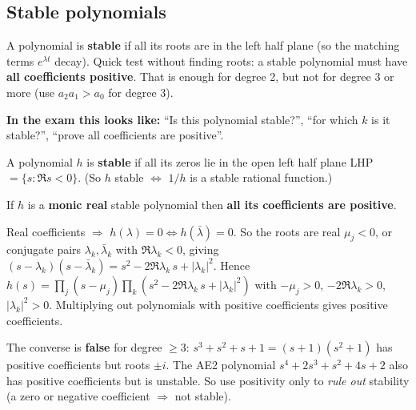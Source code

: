 \subsection{Stable polynomials \texorpdfstring{}{}}\label{sec:stabpoly}\label{ss:5-1}
\begin{plainbox}
A polynomial is \textbf{stable} if all its roots are in the left half plane (so the matching terms $e^{\lambda t}$ decay).
Quick test without finding roots: a stable polynomial must have \textbf{all coefficients positive}. That is enough for degree 2,
but not for degree 3 or more (use $a_2a_1>a_0$ for degree 3).
\par\smallskip\textbf{In the exam this looks like:} ``Is this polynomial stable?'', ``for which $k$ is it stable?'', ``prove all coefficients are positive''.
\end{plainbox}
\begin{defbox}
A polynomial $h$ is \textbf{stable} if all its zeros lie in the open left half plane LHP $=\{s:\Re s<0\}$.
(So $h$ stable $\iff$ $1/h$ is a stable rational function.)
\end{defbox}
\begin{thmbox}[title={Proposition 0.43 (necessary condition)}]
If $h$ is a \textbf{monic real} stable polynomial then \textbf{all its coefficients are positive}.
\end{thmbox}
\begin{proofbox}[title={Proof of Proposition 0.43}]
Real coefficients $\Rightarrow$ $h(\lambda)=0\iff h(\bar\lambda)=0$. So the roots are real $\mu_j<0$, or conjugate pairs $\lambda_k,\bar\lambda_k$ with $\Re\lambda_k<0$, giving
$(s-\lambda_k)(s-\bar\lambda_k)=s^2-2\Re\lambda_k\,s+|\lambda_k|^2$. Hence
$h(s)=\prod_j(s-\mu_j)\prod_k(s^2-2\Re\lambda_k\,s+|\lambda_k|^2)$ with $-\mu_j>0$, $-2\Re\lambda_k>0$, $|\lambda_k|^2>0$.
Multiplying out polynomials with positive coefficients gives positive coefficients.
\end{proofbox}
\begin{warnbox}
The converse is \textbf{false} for degree $\ge3$: $s^3+s^2+s+1=(s+1)(s^2+1)$ has positive coefficients but roots $\pm i$. The AE2 polynomial $s^4+2s^3+s^2+4s+2$ also has positive coefficients but is unstable.
So use positivity only to \emph{rule out} stability (a zero or negative coefficient $\Rightarrow$ not stable).
\end{warnbox}
